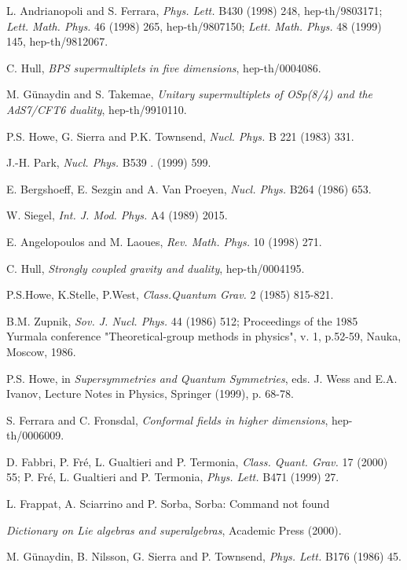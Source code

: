 \documentclass[a4paper,12pt]{article}
\begin{document}
\begin{thebibliography}{99}
 L. Andrianopoli and S. Ferrara, 
{\it Phys. Lett.} B430 (1998) 248, hep-th/9803171; 
 {\it Lett. Math. Phys.} 46 (1998) 265, hep-th/9807150;
 {\it Lett. Math. Phys.} 48
(1999) 145, hep-th/9812067. 


 C. Hull, {\it BPS supermultiplets in five dimensions}, 
hep-th/0004086. 

 M. G\"unaydin and S. Takemae, {\it Unitary supermultiplets 
of OSp(8/4) and the AdS7/CFT6 duality}, hep-th/9910110. 

 P.S. Howe, G. Sierra and P.K. Townsend, {\it Nucl. Phys.} B 221 
(1983) 331. 

 J.-H. Park, {\it Nucl. Phys.} B539 .
(1999) 599. 

 E. Bergshoeff, E. Sezgin and A. Van Proeyen, {\it Nucl. Phys.} B264 
(1986) 653. 

 W. Siegel, {\it Int. J. Mod. Phys.} A4 
(1989) 2015. 

 E. Angelopoulos and M. Laoues, {\it Rev. Math. Phys.} 10 (1998) 271.

 C. Hull, {\it  Strongly coupled gravity and 
duality}, hep-th/0004195.  

P.S.Howe, K.Stelle, P.West,  {\it Class.Quantum Grav.} 2 (1985) 
815-821. 

 B.M. Zupnik, {\it Sov. J. Nucl. Phys.} 44 (1986) 512; 
Proceedings of the 1985 Yurmala conference "Theoretical-group 
methods in physics", v. 1, p.52-59, Nauka, Moscow, 1986. 

 P.S. Howe, in {\it Supersymmetries and Quantum 
Symmetries}, eds. J. Wess and E.A. Ivanov, Lecture Notes in 
Physics, Springer (1999), p. 68-78. 

 S. Ferrara and C. Fronsdal, {\it Conformal fields in 
higher dimensions}, hep-th/0006009. 

 D. Fabbri, P. Fr\'e, L. Gualtieri and P. Termonia, {\it Class. Quant. Grav.} 17 (2000) 55; P. Fr\'e, L. Gualtieri and P. Termonia, {\it Phys. Lett.} B471 (1999) 27.

 L. Frappat, A. Sciarrino and P. Sorba, 
Sorba: Command not found

{\it Dictionary on Lie algebras and superalgebras}, Academic Press 
(2000). 

 M. G\"unaydin, B. Nilsson, G. Sierra and P. 
Townsend, {\it  Phys. Lett.} B176 (1986) 45. 


\end{thebibliography}
\end{document}
